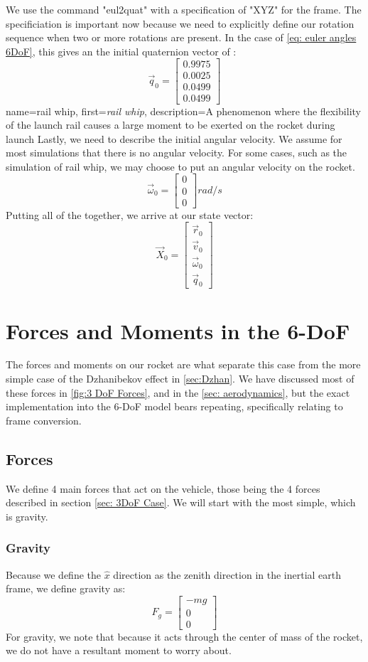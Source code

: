 \documentclass[12pt]{report}
\begin{document}
We use the command "eul2quat" with a specification of "XYZ" for the frame. The specificiation is important now because we need to explicitly define our rotation sequence when two or more rotations are present. In the case of \eqref{eq: euler angles 6DoF}, this gives an the initial \gls{quaternion} vector of :
$$\vec{q}_0=\begin{bmatrix}
    0.9975\\0.0025\\0.0499\\0.0499
\end{bmatrix}$$
{
    name=rail whip,
    first={\textit{rail whip}},
    description={A phenomenon where the flexibility of the launch rail causes a large moment to be exerted on the rocket during launch}
}
Lastly, we need to describe the initial angular velocity. We assume for most simulations that there is no angular velocity. For some cases, such as the simulation of \gls{rail whip}, we may choose to put an angular velocity on the rocket.
$$\vec{\omega}_0=\begin{bmatrix}
0\\0\\0
\end{bmatrix} rad/s$$
Putting all of the together, we arrive at our \gls{state vector}:
$$\vec{X}_0=\begin{bmatrix}
    \vec{r}_0\\\vec{v}_0\\\vec{\omega}_0\\\vec{q}_0
\end{bmatrix}$$
\section{Forces and Moments in the 6-DoF}
The forces and moments on our rocket are what separate this case from the more simple case of the Dzhanibekov effect in \ref{sec:Dzhan}. We have discussed most of these forces in \ref{fig:3 DoF Forces}, and in the \ref{sec: aerodynamics}, but the exact implementation into the 6-DoF model bears repeating, specifically relating to frame conversion.
\subsection{Forces}\label{6DoF Forces}
We define 4 main forces that act on the vehicle, those being the 4 forces described in section \ref{sec: 3DoF Case}. We will start with the most simple, which is gravity.
\subsubsection{Gravity}
Because we define the $\hat{x}$ direction as the zenith direction in the inertial earth frame, we define gravity as:
\begin{equation}
   F_g= \begin{bmatrix}
    -mg\\0\\0
\end{bmatrix}
\end{equation}
For gravity, we note that because it acts through the center of mass of the rocket, we do not have a resultant moment to worry about.
\end{document}
